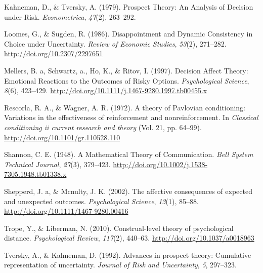 \documentclass[12pt,]{article}
\begin{document}
\hypertarget{ref-Kahneman1979}{}
Kahneman, D., \& Tversky, A. (1979). Prospect Theory: An Analysis of
Decision under Risk. \emph{Econometrica}, \emph{47}(2), 263--292.

\hypertarget{ref-Loomes1986}{}
Loomes, G., \& Sugden, R. (1986). Disappointment and Dynamic Consistency
in Choice under Uncertainty. \emph{Review of Economic Studies},
\emph{53}(2), 271--282. \url{http://doi.org/10.2307/2297651}

\hypertarget{ref-Mellers1997}{}
Mellers, B. a, Schwartz, a., Ho, K., \& Ritov, I. (1997). Decision
Affect Theory: Emotional Reactions to the Outcomes of Risky Options.
\emph{Psychological Science}, \emph{8}(6), 423--429.
\url{http://doi.org/10.1111/j.1467-9280.1997.tb00455.x}

\hypertarget{ref-Rescorla1972}{}
Rescorla, R. A., \& Wagner, A. R. (1972). A theory of Pavlovian
conditioning: Variations in the effectiveness of reinforcement and
nonreinforcement. In \emph{Classical conditioning ii current research
and theory} (Vol. 21, pp. 64--99).
\url{http://doi.org/10.1101/gr.110528.110}

\hypertarget{ref-Shannon1948}{}
Shannon, C. E. (1948). A Mathematical Theory of Communication.
\emph{Bell System Technical Journal}, \emph{27}(3), 379--423.
\url{http://doi.org/10.1002/j.1538-7305.1948.tb01338.x}

\hypertarget{ref-Shepperd2002}{}
Shepperd, J. a, \& Mcnulty, J. K. (2002). The affective consequences of
expected and unexpected outcomes. \emph{Psychological Science},
\emph{13}(1), 85--88. \url{http://doi.org/10.1111/1467-9280.00416}

\hypertarget{ref-Trope2010}{}
Trope, Y., \& Liberman, N. (2010). Construal-level theory of
psychological distance. \emph{Psychological Review}, \emph{117}(2),
440--63. \url{http://doi.org/10.1037/a0018963}

\hypertarget{ref-Tversky1992}{}
Tversky, A., \& Kahneman, D. (1992). Advances in prospect theory:
Cumulative representation of uncertainty. \emph{Journal of Risk and
Uncertainty}, \emph{5}, 297--323.
\end{document}

